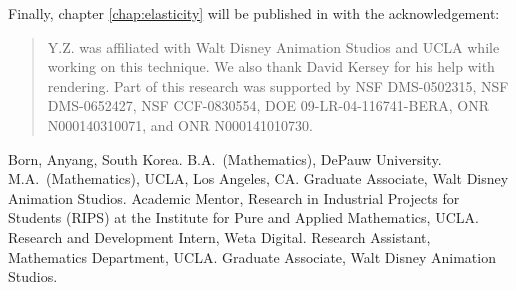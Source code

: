 {Finally, chapter \ref{chap:elasticity} will be published in \cite{mcadams:2011:elasticity} with the acknowledgement:
\begin{quote}
Y.Z. was affiliated with Walt Disney Animation Studios and UCLA while working on
this technique. We also thank David Kersey for his help with rendering. Part of this
research was supported by NSF DMS-0502315, NSF DMS-0652427, NSF CCF-0830554, DOE
09-LR-04-116741-BERA, ONR N000140310071, and ONR N000141010730.
\end{quote}
}

 {Born, Anyang, South Korea.}
 {B.A.~(Mathematics), DePauw University.}
 {M.A.~(Mathematics), UCLA, Los Angeles, CA.}
 {Graduate Associate, Walt Disney Animation Studios.}
 {Academic Mentor, Research in Industrial Projects for Students (RIPS) at the Institute for Pure and Applied Mathematics, UCLA.}
 {Research and Development Intern, Weta Digital.}
 {Research Assistant, Mathematics Department, UCLA.}
 {Graduate Associate, Walt Disney Animation Studios.}






